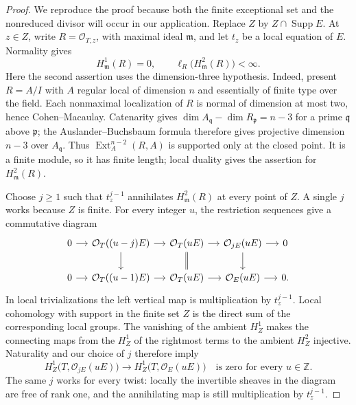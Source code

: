 \begin{proof}
We reproduce the proof because both the finite exceptional set and the
nonreduced divisor will occur in our application.  Replace $Z$ by
$Z\cap\operatorname{Supp}E$.  At $z\in Z$, write
$R=\mathcal O_{T,z}$, with maximal ideal $\mathfrak m$, and let $t_z$ be
a local equation of $E$.  Normality gives
\[
 H^1_{\mathfrak m}(R)=0,
 \qquad \ell_R\bigl(H^2_{\mathfrak m}(R)\bigr)<\infty.
\]
Here the second assertion uses the dimension-three hypothesis.
Indeed, present $R=A/I$ with $A$ regular local of dimension $n$ and
essentially of finite type over the field.  Each nonmaximal localization
of $R$ is normal of dimension at most two, hence Cohen--Macaulay.
Catenarity gives
$\dim A_{\mathfrak q}-\dim R_{\mathfrak p}=n-3$ for a prime
$\mathfrak q$ above $\mathfrak p$; the Auslander--Buchsbaum formula
therefore gives projective dimension $n-3$ over $A_{\mathfrak q}$.
Thus
$\operatorname{Ext}^{n-2}_A(R,A)$ is supported only at the closed point.
It is a finite module, so it has finite length; local duality gives the
assertion for $H^2_{\mathfrak m}(R)$.

Choose $j\geq1$ such that $t_z^{j-1}$ annihilates
$H^2_{\mathfrak m}(R)$ at every point of $Z$.  A single $j$ works because
$Z$ is finite.  For every integer $u$, the restriction sequences give
a commutative diagram
\[
\begin{tikzcd}[column sep=small]
0\arrow[r]&\mathcal O_T((u-j)E)\arrow[r]\arrow[d]
 &\mathcal O_T(uE)\arrow[r]\arrow[d,equal]
 &\mathcal O_{jE}(uE)\arrow[r]\arrow[d]&0\\
0\arrow[r]&\mathcal O_T((u-1)E)\arrow[r]
 &\mathcal O_T(uE)\arrow[r]
 &\mathcal O_E(uE)\arrow[r]&0.
\end{tikzcd}
\]
In local trivializations the left vertical map is multiplication by
$t_z^{j-1}$.  Local cohomology with support in the finite set $Z$ is the
direct sum of the corresponding local groups.  The vanishing of the
ambient $H^1_Z$ makes the connecting maps from the $H^1_Z$ of the
rightmost terms to the ambient $H^2_Z$ injective.  Naturality and our
choice of $j$ therefore imply
\begin{equation}\label{eq:torsion-obstruction-zero}
 H^1_Z\bigl(T,\mathcal O_{jE}(uE)\bigr)
    \longrightarrow H^1_Z\bigl(T,\mathcal O_E(uE)\bigr)
       \quad\text{is zero for every }u\in\mathbb Z.
\end{equation}
The same $j$ works for every twist: locally the invertible sheaves in
the diagram are free of rank one, and the annihilating map is still
multiplication by $t_z^{j-1}$.


\end{proof}
